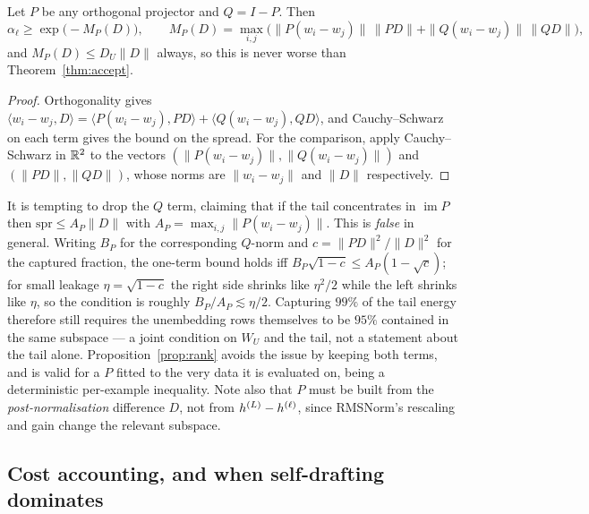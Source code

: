 \begin{proposition}
\label{prop:rank}
Let $P$ be any orthogonal projector and $Q = I - P$. Then
\begin{equation}
  \alpha_\ell \ge \exp\big(-M_P(D)\big),
  \qquad
  M_P(D) = \max_{i,j}\Big( \|P(w_i-w_j)\|\,\|PD\| + \|Q(w_i-w_j)\|\,\|QD\| \Big),
\end{equation}
and $M_P(D) \le D_U\|D\|$ always, so this is never worse than
Theorem~\ref{thm:accept}.
\end{proposition}

\begin{proof}
Orthogonality gives
$\langle w_i-w_j, D\rangle = \langle P(w_i-w_j), PD\rangle + \langle Q(w_i-w_j), QD\rangle$,
and Cauchy--Schwarz on each term gives the bound on the spread. For the
comparison, apply Cauchy--Schwarz in $\mathbb{R}^{2}$ to the vectors
$(\|P(w_i-w_j)\|, \|Q(w_i-w_j)\|)$ and $(\|PD\|,\|QD\|)$, whose norms are
$\|w_i-w_j\|$ and $\|D\|$ respectively.
\end{proof}

\begin{remark}
\label{rem:onetermfails}
It is tempting to drop the $Q$ term, claiming that if the tail concentrates in
$\operatorname{im}P$ then $\mathrm{spr} \le A_P\|D\|$ with
$A_P = \max_{i,j}\|P(w_i-w_j)\|$. This is \emph{false} in general. Writing
$B_P$ for the corresponding $Q$-norm and $c = \|PD\|^2/\|D\|^2$ for the captured
fraction, the one-term bound holds iff
$B_P\sqrt{1-c} \le A_P(1-\sqrt c)$; for small leakage $\eta = \sqrt{1-c}$ the
right side shrinks like $\eta^2/2$ while the left shrinks like $\eta$, so the
condition is roughly $B_P/A_P \lesssim \eta/2$. Capturing $99\%$ of the tail
energy therefore still requires the unembedding rows themselves to be $95\%$
contained in the same subspace --- a joint condition on $W_U$ and the tail, not a
statement about the tail alone. Proposition~\ref{prop:rank} avoids the issue by
keeping both terms, and is valid for a $P$ fitted to the very data it is
evaluated on, being a deterministic per-example inequality. Note also that $P$
must be built from the \emph{post-normalisation} difference $D$, not from
$h^{(L)}-h^{(\ell)}$, since RMSNorm's rescaling and gain change the relevant
subspace.
\end{remark}

\subsection{Cost accounting, and when self-drafting dominates}
\label{sec:depth-cost}

